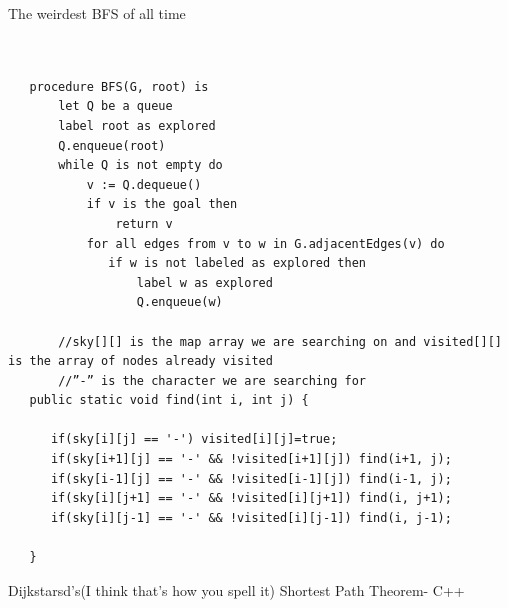 \documentclass[11pt]{scrartcl}
\begin{document}
\vspace{5mm}
\noindent The weirdest BFS of all time
\begin{lstlisting}


   procedure BFS(G, root) is
       let Q be a queue
       label root as explored
       Q.enqueue(root)
       while Q is not empty do
           v := Q.dequeue()
           if v is the goal then
               return v
           for all edges from v to w in G.adjacentEdges(v) do
              if w is not labeled as explored then
                  label w as explored
                  Q.enqueue(w)

       //sky[][] is the map array we are searching on and visited[][] is the array of nodes already visited
       //”-” is the character we are searching for
   public static void find(int i, int j) {
 
      if(sky[i][j] == '-') visited[i][j]=true;
      if(sky[i+1][j] == '-' && !visited[i+1][j]) find(i+1, j);
      if(sky[i-1][j] == '-' && !visited[i-1][j]) find(i-1, j);
      if(sky[i][j+1] == '-' && !visited[i][j+1]) find(i, j+1);
      if(sky[i][j-1] == '-' && !visited[i][j-1]) find(i, j-1);
 
   }
 \end{lstlisting}
\vspace{5mm}
\noindent Dijkstarsd's(I think that's how you spell it) Shortest Path Theorem- C++
\end{document}
